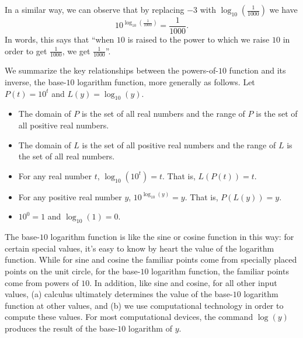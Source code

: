 \documentclass[nooutcomes]{ximera}
\begin{document}
In a similar way, we can observe that by replacing \(-3\) with \(\log_{10}\left(\frac{1}{1000}\right)\) we have%
\begin{equation}
10^{\log_{10}\left(\frac{1}{1000}\right)} = \frac{1}{1000}\text{.}\label{eq-exp-log-base-10-minus-3-undo}
\end{equation}
In words, this says that ``when \(10\) is raised to the power to which we raise \(10\) in order to get \(\frac{1}{1000}\), we get \(\frac{1}{1000}\)''.%

We summarize the key relationships between the powers-of-\(10\) function and its inverse, the base-\(10\) logarithm function, more generally as follows. %
Let \(P(t) = 10^t\) and \(L(y) = \log_{10}(y)\).
\begin{itemize}[label=\textbullet]
\item
The domain of \(P\) is the set of all real numbers and the range of \(P\) is the set of all positive real numbers.%
\item
The domain of \(L\) is the set of all positive real numbers and the range of \(L\) is the set of all real numbers.%
\item
For any real number \(t\), \(\log_{10}(10^t) = t\).  That is, \(L(P(t)) = t\).%
\item
For any positive real number \(y\), \(10^{\log_{10}(y)} = y\).  That is, \(P(L(y)) = y\).%
\item
\(10^0 = 1\) and \(\log_{10}(1) = 0\).%
\end{itemize}

The base-\(10\) logarithm function is like the sine or cosine function in this way:  for certain special values, it's easy to know by heart the value of the logarithm function.  While for sine and cosine the familiar points come from specially placed points on the unit circle, for the base-\(10\) logarithm function, the familiar points come from powers of \(10\). In addition, like sine and cosine, for all other input values, (a) calculus ultimately determines the value of the base-\(10\) logarithm function at other values, and (b) we use computational technology in order to compute these values.  For most computational devices, the command $\log(y)$ produces the result of the base-\(10\) logarithm of \(y\).%
\end{document}
